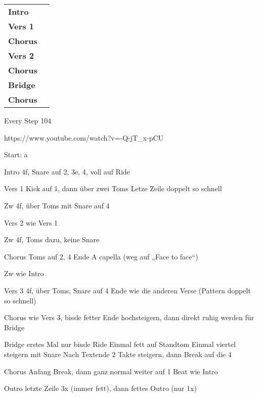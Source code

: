 
\begin{tabular}{p{1.6cm}l}
	\textbf{Intro}  & \\
	\textbf{Vers 1} & \\
	\textbf{Chorus} & \\
	\textbf{Vers 2} & \\
	\textbf{Chorus} & \\
	\textbf{Bridge} & \\
	\textbf{Chorus} & \\
\end{tabular}

Every Step											104

https://www.youtube.com/watch?v=-Q-jT_x-pCU

Start:	a

Intro		4f, Snare auf 2, 3e, 4, voll auf Ride

Vers 1	Kick auf 1, dann über zwei Toms
		Letze Zeile doppelt so schnell

Zw		4f, über Toms mit Snare auf 4

Vers 2	wie Vers 1

Zw		4f, Toms dazu, keine Snare

Chorus	Toms auf 2, 4
		Ende A capella (weg auf „Face to face“)

Zw		wie Intro 

Vers 3	4f, über Toms, Snare auf 4
Ende wie die anderen Verse (Pattern doppelt so schnell)

Chorus	wie Vers 3, bissle fetter
	Ende hochsteigern, dann direkt ruhig werden für Bridge

Bridge	erstes Mal nur bissle Ride
		Einmal fett auf Standtom
		Einmal viertel steigern mit Snare
	Nach Textende 2 Takte steigern, dann Break auf die 4 

Chorus	Anfang Break, dann ganz normal weiter auf 1
Beat wie Intro

Outro		letzte Zeile 3x (immer fett), dann fettes Outro (nur 1x)
